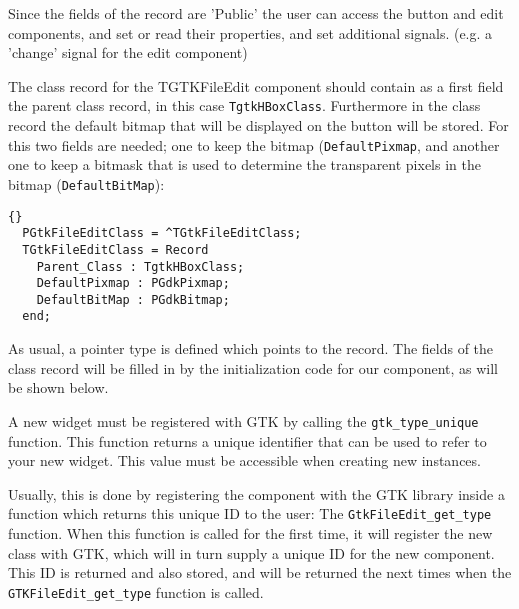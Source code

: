 \documentclass[10pt]{article}
\begin{document}
Since the fields of the record are 'Public' the user can access the button
and edit components, and set or read their properties, and set additional 
signals. (e.g. a 'change' signal for the edit component)

The class record for the {TGTKFileEdit} component should contain as a first 
field the parent class record, in this case \lstinline|TgtkHBoxClass|. Furthermore
in the class record the default bitmap that will be displayed on the button
will be stored. For this two fields are needed; one to keep the bitmap
(\lstinline|DefaultPixmap|, and
another one to keep a bitmask that is used to determine the transparent
pixels in the bitmap (\lstinline|DefaultBitMap|):
\begin{lstlisting}{}
  PGtkFileEditClass = ^TGtkFileEditClass;
  TGtkFileEditClass = Record
    Parent_Class : TgtkHBoxClass;
    DefaultPixmap : PGdkPixmap;
    DefaultBitMap : PGdkBitmap;
  end;
\end{lstlisting}
As usual, a pointer type is defined which points to the record. The fields
of the class record will be filled in by the initialization code for our
component, as will be shown below.

A new widget must be registered with GTK by calling the
\lstinline|gtk_type_unique| function. This function returns a unique
identifier that can be used to refer to your new widget. This value
must be accessible when creating new instances.

Usually, this is done by registering the component with the GTK library
inside a function which returns this unique ID to the user:
The \lstinline|GtkFileEdit_get_type| function. 
When this function is called for the first time, it will register
the new class with GTK, which will in turn supply a unique ID for the
new component. This ID is returned and also stored, and will be returned
the next times when the \lstinline|GTKFileEdit_get_type| function is called.
\end{document}
